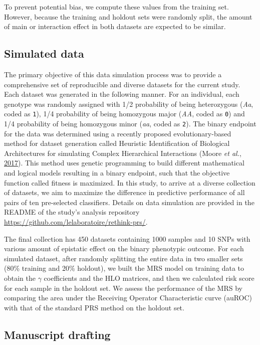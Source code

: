 \documentclass[a4paper,twoside, 9pt]{article}
\begin{document}
To prevent potential bias, we compute these values from the training set.
However, because the training and holdout sets were randomly split, the amount of main or interaction effect in both datasets are expected to be similar.

\subsection{Simulated data}\label{simulated-data}

\noindent The primary objective of this data simulation process was to provide a
comprehensive set of reproducible and diverse datasets for the current
study. Each dataset was generated in the following manner. For an
individual, each genotype was randomly assigned with 1/2 probability of
being heterozygous (\emph{Aa}, coded as \texttt{1}), 1/4 probability of
being homozygous major (\emph{AA}, coded as \texttt{0}) and 1/4
probability of being homozygous minor (\emph{aa}, coded as \texttt{2}).
The binary endpoint for the data was determined using a recently
proposed evolutionary-based method for dataset generation called
Heuristic Identification of Biological Architectures for simulating
Complex Hierarchical Interactions (Moore \emph{et al.},
\protect\hyperlink{ref-pDXdtMFa}{2017}). 
This method uses genetic programming to build different mathematical and logical models resulting in a binary endpoint, such that the objective function called fitness is maximized.
In this study, to arrive at a diverse collection of datasets, we aim to maximize the difference in predictive performance of all pairs of ten pre-selected classifiers.
Details on data simulation are
provided in the README of the study's analysis repository
\url{https://github.com/lelaboratoire/rethink-prs/}.

The final collection has 450 datasets containing 1000 samples and 10
SNPs with various amount of epistatic effect on the binary phenotypic
outcome. For each simulated dataset, after randomly splitting the entire
data in two smaller sets (80\% training and 20\% holdout), we built the
MRS model on training data to obtain the \(\gamma\) coefficients and the
HLO matrices, and then we calculated risk score for each sample in the
holdout set. We assess the performance of the MRS by comparing the area
under the Receiving Operator Characteristic curve (auROC) with that of
the standard PRS method on the holdout set.

\subsection{Manuscript drafting}\label{manuscript-drafting}
\end{document}
